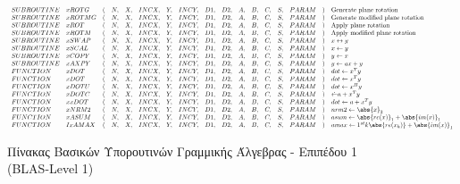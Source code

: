 \begin{figure}
    \centering
\[
\scalemath{0.6}{
\begin{array}{lllllllllllllllll}
SUBROUTINE & xROTG  & ( & N, & X, & INCX, & Y, & INCY, & D1, & D2, & A, & B, & C, & S, & PARAM & ) & \text{Generate plane rotation}\\
SUBROUTINE & xROTMG & ( & N, & X, & INCX, & Y, & INCY, & D1, & D2, & A, & B, & C, & S, & PARAM & ) & \text{Generate modified plane rotation}\\
SUBROUTINE & xROT   & ( & N, & X, & INCX, & Y, & INCY, & D1, & D2, & A, & B, & C, & S, & PARAM & ) & \text{Apply plane rotation}\\
SUBROUTINE & xROTM  & ( & N, & X, & INCX, & Y, & INCY, & D1, & D2, & A, & B, & C, & S, & PARAM & ) & \text{Apply modified plane rotation}\\
SUBROUTINE & xSWAP  & ( & N, & X, & INCX, & Y, & INCY, & D1, & D2, & A, & B, & C, & S, & PARAM & ) & x \leftrightarrow y\\
SUBROUTINE & xSCAL  & ( & N, & X, & INCX, & Y, & INCY, & D1, & D2, & A, & B, & C, & S, & PARAM & ) & x \leftarrow y\\
SUBROUTINE & xCOPY  & ( & N, & X, & INCX, & Y, & INCY, & D1, & D2, & A, & B, & C, & S, & PARAM & ) & y \leftarrow x\\
SUBROUTINE & xAXPY  & ( & N, & X, & INCX, & Y, & INCY, & D1, & D2, & A, & B, & C, & S, & PARAM & ) & y \leftarrow ax + y\\
FUNCTION   & xDOT   & ( & N, & X, & INCX, & Y, & INCY, & D1, & D2, & A, & B, & C, & S, & PARAM & ) & dot \leftarrow x^Ty\\
FUNCTION   & xDOT   & ( & N, & X, & INCX, & Y, & INCY, & D1, & D2, & A, & B, & C, & S, & PARAM & ) & dot \leftarrow x^Ty\\
FUNCTION   & xDOTU  & ( & N, & X, & INCX, & Y, & INCY, & D1, & D2, & A, & B, & C, & S, & PARAM & ) & dot \leftarrow x^Hy\\
FUNCTION   & xDOTC  & ( & N, & X, & INCX, & Y, & INCY, & D1, & D2, & A, & B, & C, & S, & PARAM & ) & \dot \leftarrow a + x^Ty\\
FUNCTION   & xxDOT  & ( & N, & X, & INCX, & Y, & INCY, & D1, & D2, & A, & B, & C, & S, & PARAM & ) &  dot \leftarrow a + x^Ty\\
FUNCTION   & xNRM2  & ( & N, & X, & INCX, & Y, & INCY, & D1, & D2, & A, & B, & C, & S, & PARAM & ) & nrm2 \leftarrow \abs{x}_2\\
FUNCTION   & xASUM  & ( & N, & X, & INCX, & Y, & INCY, & D1, & D2, & A, & B, & C, & S, & PARAM & ) & asum \leftarrow \abs{re(x)}_1 + \abs{im(x)}_1\\
FUNCTION   & IxAMAX & ( & N, & X, & INCX, & Y, & INCY, & D1, & D2, & A, & B, & C, & S, & PARAM & ) & amax \leftarrow 1^{st}k \abs{re(x_k)} + \abs{im(x)}_1\\
\end{array}
}
\]
    \caption{Πίνακας Βασικών Υπορουτινών Γραμμικής Άλγεβρας - Επιπέδου 1 (BLAS-Level 1)}
    \label{code:blas-level-1}
\end{figure}

